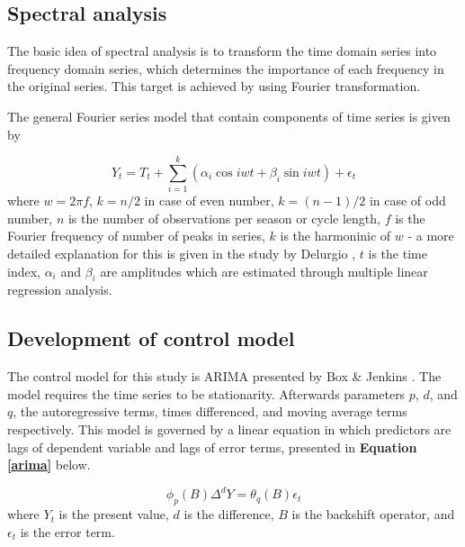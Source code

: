 \subsection{Spectral analysis}

The basic idea of spectral analysis is to transform the time domain series into frequency
domain series, which determines the importance of each frequency in the original series. This
target is achieved by using Fourier transformation.

The general Fourier series model that contain components of time series is given by

\begin{equation}
	Y_t = T_t + \sum_{i=1}^{k}(\alpha_i \cos iwt + \beta_i \sin iwt) + \epsilon_t
\end{equation}
where $w = 2\pi f$, $k = n/2$ in case of even number, $k = (n-1)/2$ in case of odd number, $n$ is the number of observations per season or cycle length, $f$ is the Fourier frequency of number of peaks in series, $k$ is the harmoninic of $w$ - a more detailed explanation for this is given in the study by Delurgio \cite{armstrong2001principles}, $t$ is the time index, $\alpha_i$ and $\beta_i$ are amplitudes which are estimated through multiple linear regression analysis.

\subsection{Development of control model}

The control model for this study is ARIMA presented by Box \& Jenkins \cite{box1976time}. The model requires the time series to be stationarity. Afterwards parameters $p$, $d$, and $q$, the autoregressive terms, times differenced, and moving average terms respectively. This model is governed by a linear equation in which predictors are lags of dependent variable and lags of error terms, presented in \textbf{Equation \ref{arima}} below.

\begin{equation} \label{arima}
	\phi_p(B) \Delta^d Y = \theta_q (B) \epsilon_t
\end{equation}
where $Y_t$ is the present value, $d$ is the difference, $B$ is the backshift operator, and $\epsilon_t$ is the error term.